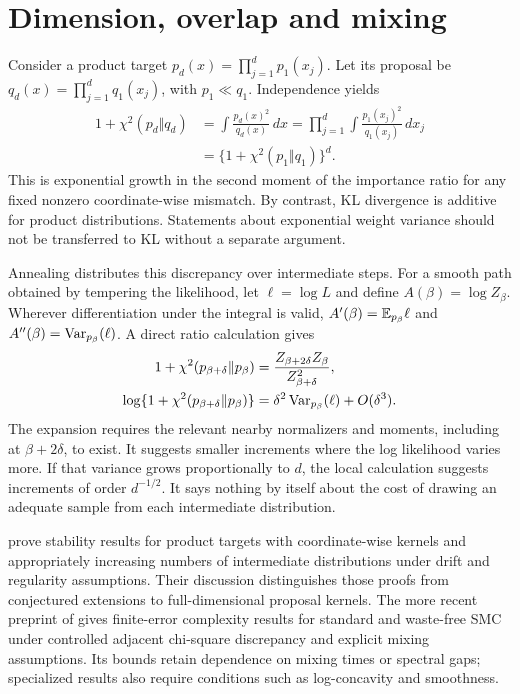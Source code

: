 \section{Dimension, overlap and mixing}
\label{sec:bf-is-modern-smc-dimension}

Consider a product target $p_d(x)=\prod_{j=1}^d p_1(x_j)$.
Let its proposal be $q_d(x)=\prod_{j=1}^d q_1(x_j)$, with $p_1\ll q_1$.
Independence yields
\begin{align}
 1+\chi^2(p_d\Vert q_d)
 &=\int\frac{p_d(x)^2}{q_d(x)}\,dx
   =\prod_{j=1}^d\int\frac{p_1(x_j)^2}{q_1(x_j)}\,dx_j \\
 &=\{1+\chi^2(p_1\Vert q_1)\}^d.
 \label{eq:bf-is-smc-product-chi}
\end{align}
This is exponential growth in the second moment of the importance ratio
for any fixed nonzero coordinate-wise mismatch. By contrast, KL divergence
is additive for product distributions. Statements about exponential weight
variance should not be transferred to KL without a separate argument.

Annealing distributes this discrepancy over intermediate steps.
For a smooth path obtained by tempering the likelihood, let $\ell=\log L$ and define
$A(\beta)=\log Z_\beta$. Wherever differentiation under the integral is
valid, $A'(\beta)=\mathbb{E}_{p_\beta}\ell$ and
$A''(\beta)=\operatorname{Var}_{p_\beta}(\ell)$. A direct ratio calculation gives
\begin{align}
 1+\chi^2(p_{\beta+\delta}\Vert p_\beta)
 &=\frac{Z_{\beta+2\delta}Z_\beta}{Z_{\beta+\delta}^2},\\
 \log\{1+\chi^2(p_{\beta+\delta}\Vert p_\beta)\}
 &=\delta^2\operatorname{Var}_{p_\beta}(\ell)+O(\delta^3).
 \label{eq:bf-is-smc-local-chi}
\end{align}
The expansion requires the relevant nearby normalizers and moments,
including at $\beta+2\delta$, to exist. It suggests smaller increments
where the log likelihood varies more. If that variance grows proportionally
to $d$, the local calculation suggests increments of order $d^{-1/2}$.
It says nothing by itself about the cost of drawing an adequate sample
from each intermediate distribution.

\citet{beskos2014highdimsmc} prove stability results for product targets
with coordinate-wise kernels and appropriately increasing numbers of
intermediate distributions under drift and regularity assumptions. Their
discussion distinguishes those proofs from conjectured extensions to
full-dimensional proposal kernels. The more recent preprint of
\citet[Sections 2--3]{lefay2026smccomplexity} gives finite-error complexity
results for standard and waste-free SMC under controlled adjacent
chi-square discrepancy and explicit mixing assumptions. Its bounds retain
dependence on mixing times or spectral gaps; specialized results also
require conditions such as log-concavity and smoothness.

